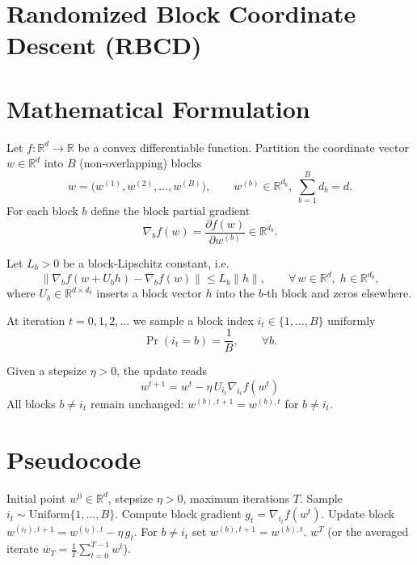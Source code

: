 \documentclass{article}
\begin{document}
\section*{Randomized Block Coordinate Descent (RBCD)}

\section*{Mathematical Formulation}
Let $f:\mathbb{R}^{d}\rightarrow\mathbb{R}$ be a convex differentiable function.  
Partition the coordinate vector $w\in\mathbb{R}^{d}$ into $B$ (non‑overlapping) blocks
\[
w=\bigl(w^{(1)},w^{(2)},\dots ,w^{(B)}\bigr),\qquad 
w^{(b)}\in\mathbb{R}^{d_{b}},\; \sum_{b=1}^{B}d_{b}=d .
\]
For each block $b$ define the block partial gradient
\[
\nabla_{b}f(w)=\frac{\partial f(w)}{\partial w^{(b)}}\in\mathbb{R}^{d_{b}} .
\]

Let $L_{b}>0$ be a block‑Lipschitz constant, i.e.
\[
\bigl\|\nabla_{b}f(w+U_{b}h)-\nabla_{b}f(w)\bigr\|
\le L_{b}\|h\|,\qquad \forall\,w\in\mathbb{R}^{d},\;h\in\mathbb{R}^{d_{b}},
\]
where $U_{b}\in\mathbb{R}^{d\times d_{b}}$ inserts a block vector $h$ into the $b$‑th block
and zeros elsewhere.

At iteration $t=0,1,2,\dots$ we sample a block index $i_{t}\in\{1,\dots ,B\}$ uniformly
\[
\Pr(i_{t}=b)=\frac{1}{B},\qquad \forall b .
\]

Given a stepsize $\eta>0$, the update reads
\[
\boxed{
w^{t+1}=w^{t}-\eta\,U_{i_{t}}\nabla_{i_{t}}f\!\left(w^{t}\right)
}
\tag{1}
\]
All blocks $b\neq i_{t}$ remain unchanged:
$w^{(b),t+1}=w^{(b),t}$ for $b\neq i_{t}$.

\section*{Pseudocode}
\begin{algorithm}[H]
\caption{Randomized Block Coordinate Descent}
\begin{algorithmic}[1]
\Require Initial point $w^{0}\in\mathbb{R}^{d}$, stepsize $\eta>0$, maximum iterations $T$.
    \State Sample $i_{t}\sim\text{Uniform}\{1,\dots ,B\}$.
    \State Compute block gradient $g_{t}= \nabla_{i_{t}}f\!\left(w^{t}\right)$.
    \State Update block $w^{(i_{t}),t+1}=w^{(i_{t}),t}-\eta\,g_{t}$.
    \State For $b\neq i_{t}$ set $w^{(b),t+1}=w^{(b),t}$.
\EndFor
\State \Return $w^{T}$ (or the averaged iterate $\bar w_{T}=\tfrac{1}{T}\sum_{t=0}^{T-1}w^{t}$).
\end{algorithmic}
\end{algorithm}
\end{document}
